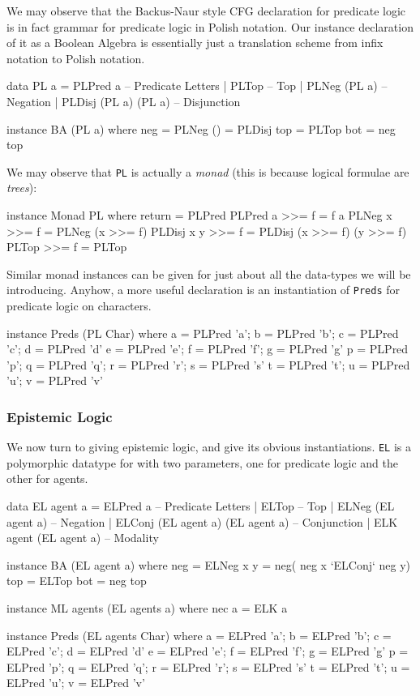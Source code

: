 \documentclass[11pt]{article}
\theoremstyle{definition}
\begin{document}
We may observe that the Backus-Naur style CFG declaration for predicate logic is in fact grammar for predicate logic in Polish notation.  Our instance declaration of it as a Boolean Algebra is essentially just a translation scheme from infix notation to Polish notation.

\begin{code}
data PL a = 
     PLPred a              -- Predicate Letters
   | PLTop                 -- Top
   | PLNeg (PL a)          -- Negation
   | PLDisj (PL a) (PL a)  -- Disjunction

instance BA (PL a) where
  neg = PLNeg
  (\/) = PLDisj
  top = PLTop
  bot = neg top
\end{code}

We may observe that \texttt{PL} is actually a \emph{monad} (this is because logical formulae are \emph{trees}):

\begin{code}
instance Monad PL where
  return = PLPred
  PLPred a >>= f = f a
  PLNeg x >>= f = PLNeg (x >>= f)
  PLDisj x y >>= f = PLDisj (x >>= f) (y >>= f)
  PLTop >>= f = PLTop
\end{code}

Similar monad instances can be given for just about all the data-types we will be introducing.  Anyhow, a more useful declaration is an instantiation of \texttt{Preds} for predicate logic on characters.

\begin{code}
instance Preds (PL Char) where
  a = PLPred 'a'; b = PLPred 'b'; c = PLPred 'c'; d = PLPred 'd'
  e = PLPred 'e'; f = PLPred 'f'; g = PLPred 'g'
  p = PLPred 'p'; q = PLPred 'q'; r = PLPred 'r'; s = PLPred 's'
  t = PLPred 't'; u = PLPred 'u'; v = PLPred 'v' 
\end{code}

\subsubsection{Epistemic Logic}

We now turn to giving epistemic logic, and give its obvious instantiations.  \texttt{EL} is a polymorphic datatype for with two parameters, one for predicate logic and the other for agents.

\begin{code}
data EL agent a = 
     ELPred a                             -- Predicate Letters
   | ELTop                                -- Top
   | ELNeg (EL agent a)                   -- Negation
   | ELConj (EL agent a) (EL agent a)     -- Conjunction
   | ELK agent (EL agent a)               -- Modality

instance BA (EL agent a) where
  neg = ELNeg
  x \/ y = neg( neg x `ELConj` neg y)
  top = ELTop
  bot = neg top

instance ML agents (EL agents a) where
  nec a = ELK a
  
instance Preds (EL agents Char) where
  a = ELPred 'a'; b = ELPred 'b'; c = ELPred 'c'; d = ELPred 'd'
  e = ELPred 'e'; f = ELPred 'f'; g = ELPred 'g'
  p = ELPred 'p'; q = ELPred 'q'; r = ELPred 'r'; s = ELPred 's'
  t = ELPred 't'; u = ELPred 'u'; v = ELPred 'v'
\end{code}
\end{document}
